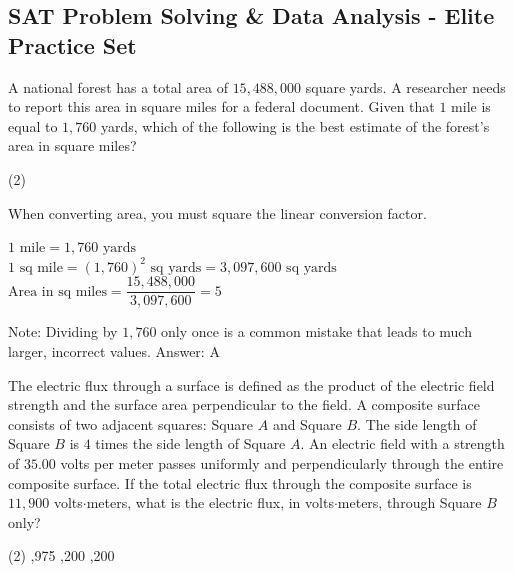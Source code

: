 \documentclass[11pt,paper=a4,answers]{exam}
\begin{document}
\begin{questions}
\pointsinrightmargin
\pointsdroppedatright
\marksnotpoints
{}
\pointformat{\boldmath\themarginpoints}
\bracketedpoints


\section*{SAT Problem Solving \& Data Analysis - Elite Practice Set}

\question
A national forest has a total area of $15,488,000$ square yards. A researcher needs to report this area in square miles for a federal document. Given that $1$ mile is equal to $1,760$ yards, which of the following is the best estimate of the forest's area in square miles?
\begin{tasks}(2)
\end{tasks}

\begin{solution}
When converting area, you must square the linear conversion factor.
\vspace{5pt}
\begin{center}
$1 \text{ mile} = 1,760 \text{ yards}$ \\
$1 \text{ sq mile} = (1,760)^2 \text{ sq yards} = 3,097,600 \text{ sq yards}$
\vspace{5pt}
$\text{Area in sq miles} = \dfrac{15,488,000}{3,097,600} = 5$
\end{center}
\vspace{5pt}
Note: Dividing by $1,760$ only once is a common mistake that leads to much larger, incorrect values.
\vspace{5pt}
Answer: \colorbox{yellow!100}{A}
\end{solution}

\vspace{1cm}

\question
The electric flux through a surface is defined as the product of the electric field strength and the surface area perpendicular to the field. A composite surface consists of two adjacent squares: Square $A$ and Square $B$. The side length of Square $B$ is $4$ times the side length of Square $A$. An electric field with a strength of $35.00$ volts per meter passes uniformly and perpendicularly through the entire composite surface. If the total electric flux through the composite surface is $11,900$ volts$\cdot$meters, what is the electric flux, in volts$\cdot$meters, through Square $B$ only?
\begin{tasks}(2)
    ,975
    ,200
    ,200
\end{tasks}


\end{questions}
\end{document}
